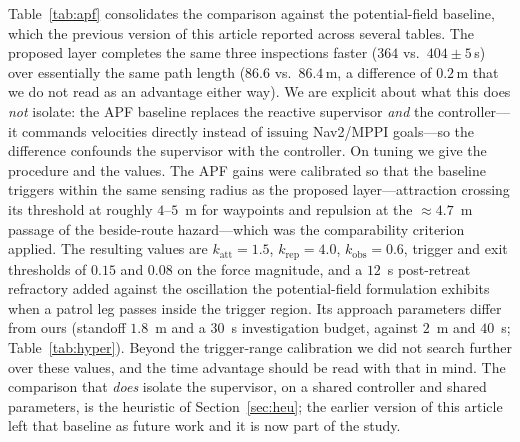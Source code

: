 Table~\ref{tab:apf} consolidates the comparison against the potential-field
baseline, which the previous version of this article reported across several tables.
The proposed layer completes the same three inspections faster ($364$ vs.\
$404\pm5$\,s) over essentially the same path length ($86.6$ vs.\ $86.4$\,m, a
difference of $0.2$\,m that we do not read as an advantage either way). We are
explicit about what this does \emph{not} isolate: the APF
baseline replaces the reactive supervisor \emph{and} the controller---it commands
velocities directly instead of issuing Nav2/MPPI goals---so the difference confounds
the supervisor with the controller. On tuning we give the procedure and the values. The APF gains were calibrated so that
the baseline triggers within the same sensing radius as the proposed layer---attraction
crossing its threshold at roughly $4$--$5$~m for waypoints and repulsion at the
${\approx}4.7$~m passage of the beside-route hazard---which was the comparability
criterion applied. The resulting values are $k_{\text{att}}=1.5$, $k_{\text{rep}}=4.0$,
$k_{\text{obs}}=0.6$, trigger and exit thresholds of $0.15$ and $0.08$ on the force
magnitude, and a $12$~s post-retreat refractory added against the oscillation the
potential-field formulation exhibits when a patrol leg passes inside the trigger
region. Its approach parameters differ from ours (standoff $1.8$~m and a $30$~s
investigation budget, against $2$~m and $40$~s; Table~\ref{tab:hyper}). Beyond the
trigger-range calibration we did not search further over these values, and the time
advantage should be read with that in mind. The comparison that \emph{does} isolate the supervisor, on a
shared controller and shared parameters, is the heuristic of Section~\ref{sec:heu};
the earlier version of this article left that baseline as future work and it is now
part of the study.

